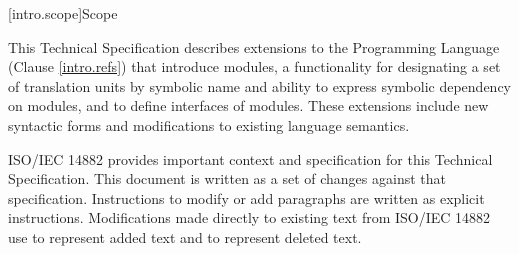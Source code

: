 
[intro.scope]{Scope}

\pnum
This Technical Specification describes extensions to the \Cpp
Programming Language (Clause \ref{intro.refs}) that introduce modules,
a functionality for designating a set of translation units by symbolic
name and ability to express symbolic dependency on modules, and to
define interfaces of modules.  These extensions include 
new syntactic forms and modifications to existing language semantics.

\pnum
ISO/IEC 14882 provides important context
and specification for this Technical Specification. This document is 
written as a set of changes against that specification. Instructions
to modify or add paragraphs are written as explicit instructions. 
Modifications made directly to existing text from ISO/IEC 14882 use  to represent added text and
 to represent deleted text.

